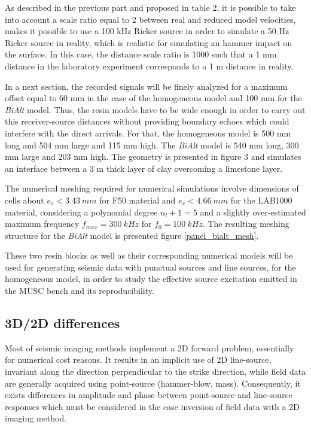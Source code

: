 \documentclass[manuscript,revised]{geophysics}
\newcommand{\bialt}{\textit{BiAlt} }
\begin{document}
\noindent As described in the previous part and proposed in table 2, it is possible to take into account a scale ratio equal to 2 between real and reduced model velocities, makes it possible to use a 100 kHz Ricker source in order to simulate a 50 Hz Ricker source in reality, which is realistic for simulating an hammer impact on the surface. In this case, the distance scale ratio is 1000 such that a 1 mm distance in the laboratory experiment corresponds to a 1 m distance in reality. 

\noindent In a next section, the recorded signals will be finely analyzed for a maximum offset equal to 60 mm in the case of the homogeneous model and 100 mm for the \bialt model. Thus, the resin models have to be wide enough in order to carry out this receiver-source distances without providing boundary echoes which could interfere with the direct arrivals. For that, the homogeneous model is 500 mm long and 504 mm large and 115 mm high. The \bialt model is 540 mm long, 300 mm large and 203 mm high. The geometry is presented in figure 3 and simulates an interface between a 3 m thick layer of clay overcoming a limestone layer.

\noindent The numerical meshing required for numerical simulations involve dimensions of cells about $e_{s}<3.43\ mm$ for F50 material and $e_{s}<4.66\ mm$ for the LAB1000 material, considering a polynomial degree $n_{l}+1=5$ and a slightly over-estimated maximum frequency $f_{max}=300\ kHz$ for $f_{0}=100\ kHz$. The resulting meshing structure for the \bialt model is presented figure \ref{panel_bialt_mesh}.

\noindent These two resin blocks as well as their corresponding numerical models will be used for generating seismic data with punctual sources and line sources, for the homogeneous model, in order to study the effective source excitation emitted in the MUSC bench and its reproducibility.

\subsection{3D/2D differences}

\noindent Most of seismic imaging methods implement a 2D forward problem, essentially for numerical cost reasons. It results in an implicit use of 2D line-source, invariant along the direction perpendicular to the strike direction, while field data are generally acquired using point-source (hammer-blow, mass). Consequently, it exists differences in amplitude and phase between point-source and line-source responses which must be considered in the case inversion of field data with a 2D imaging method.  
\end{document}
